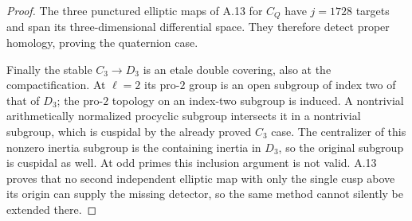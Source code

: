 \begin{proof}
The three punctured elliptic maps of A.13 for $C_Q$ have $j=1728$
targets and span its three-dimensional differential space.
They therefore detect proper homology, proving the quaternion case.

Finally the stable $C_3\to D_3$ is an etale double covering,
also at the compactification. At $\ell=2$ its pro-$2$ group is
an open subgroup of index two of that of $D_3$; the pro-$2$
topology on an index-two subgroup is induced. A nontrivial
arithmetically normalized procyclic subgroup intersects it in
a nontrivial subgroup, which is cuspidal by the already proved
$C_3$ case. The centralizer of this nonzero inertia subgroup is
the containing inertia in $D_3$, so the original subgroup is
cuspidal as well. At odd primes this inclusion argument is not
valid. A.13 proves that no second independent elliptic map with
only the single cusp above its origin can supply the missing
detector, so the same method cannot silently be extended there.
\end{proof}
